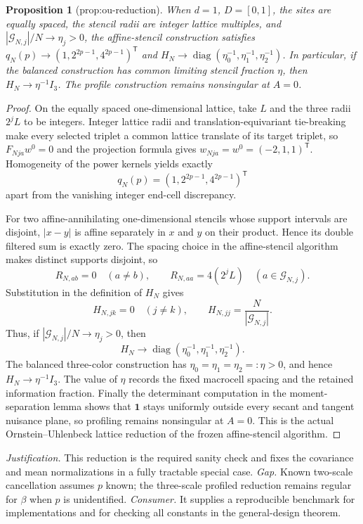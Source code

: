 \documentclass{article}
\newtheorem{proposition}{Proposition}
\begin{document}
\begin{proposition}[prop:ou-reduction]\label{prop:ou-reduction}
When \(d=1\), \(D=[0,1]\), the sites are equally spaced, the stencil radii are integer lattice multiples, and \(|\mathcal G_{N,j}|/N\to\eta_j>0\), the affine-stencil construction satisfies \(q_N(p)\to(1,2^{2p-1},4^{2p-1})^{\mathsf T}\) and \(H_N\to\operatorname{diag}(\eta_0^{-1},\eta_1^{-1},\eta_2^{-1})\). In particular, if the balanced construction has common limiting stencil fraction \(\eta\), then \(H_N\to\eta^{-1}I_3\). The profile construction remains nonsingular at \(A=0\).
\end{proposition}
\begin{proof}
On the equally spaced one-dimensional lattice, take \(L\) and the three radii \(2^jL\) to be integers.  Integer lattice radii and translation-equivariant tie-breaking make every selected triplet a common lattice translate of its target triplet, so \(F_{Nja}w^0=0\) and the projection formula gives \(w_{Nja}=w^0=(-2,1,1)^{\mathsf T}\).  Homogeneity of the power kernels yields exactly
\[
 q_N(p)=(1,2^{2p-1},4^{2p-1})^{\mathsf T}
\]
apart from the vanishing integer end-cell discrepancy.

For two affine-annihilating one-dimensional stencils whose support intervals are disjoint, \(|x-y|\) is affine separately in \(x\) and \(y\) on their product.  Hence its double filtered sum is exactly zero.  The spacing choice in the affine-stencil algorithm makes distinct supports disjoint, so
\[
 R_{N,ab}=0\quad(a\ne b),
 \qquad R_{N,aa}=4(2^jL)\quad(a\in\mathcal G_{N,j}).
\]
Substitution in the definition of \(H_N\) gives
\[
 H_{N,jk}=0\quad(j\ne k),
 \qquad H_{N,jj}=\frac{N}{|\mathcal G_{N,j}|}.
\]
Thus, if \(|\mathcal G_{N,j}|/N\to\eta_j>0\), then
\[
 H_N\longrightarrow\operatorname{diag}(\eta_0^{-1},\eta_1^{-1},\eta_2^{-1}).
\]
The balanced three-color construction has \(\eta_0=\eta_1=\eta_2=:\eta>0\), and hence \(H_N\to\eta^{-1}I_3\).  The value of \(\eta\) records the fixed macrocell spacing and the retained information fraction.  Finally the determinant computation in the moment-separation lemma shows that \(\mathbf1\) stays uniformly outside every secant and tangent nuisance plane, so profiling remains nonsingular at \(A=0\).  This is the actual Ornstein--Uhlenbeck lattice reduction of the frozen affine-stencil algorithm.
\end{proof}
\par\smallskip\noindent \textit{Justification.} This reduction is the required sanity check and fixes the covariance and mean normalizations in a fully tractable special case. \textit{Gap.} Known two-scale cancellation assumes \(p\) known; the three-scale profiled reduction remains regular for \(\beta\) when \(p\) is unidentified. \textit{Consumer.} It supplies a reproducible benchmark for implementations and for checking all constants in the general-design theorem.
\end{document}
